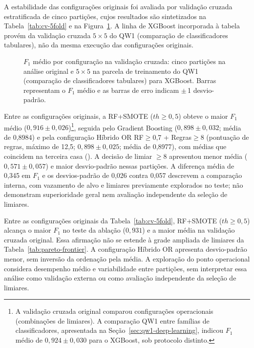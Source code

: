 \begin{sloppypar}
A estabilidade das configurações originais foi avaliada por validação cruzada estratificada de cinco partições, cujos resultados são sintetizados na Tabela~\ref{tab:cv-5fold} e na Figura~\ref{fig:cv-boxplots}. A linha de XGBoost incorporada à tabela provém da validação cruzada $5 \times 5$ do QW1 (comparação de classificadores tabulares), não da mesma execução das configurações originais.



\begin{figure}[!ht]
\centering
\resizebox{0.96\textwidth}{!}{}
\caption{$F_1$ médio por configuração na validação cruzada: cinco partições na análise original e $5 \times 5$ na parcela de treinamento do QW1 (comparação de classificadores tabulares) para XGBoost. Barras representam o $F_1$ médio e as barras de erro indicam $\pm$\,1 desvio-padrão.}
\label{fig:cv-boxplots}
\end{figure}

Entre as configurações originais, a RF+SMOTE ($th \geq 0{,}5$) obteve o maior $F_1$ médio ($0{,}916 \pm 0{,}026$)\footnote{A validação cruzada original comparou configurações operacionais (combinações de limiares). A comparação QW1 entre famílias de classificadores, apresentada na Seção~\ref{sec:qw1-deep-learning}, indicou $F_1$ médio de $0{,}924 \pm 0{,}030$ para o XGBoost, sob protocolo distinto.}, seguida pelo Gradient Boosting ($0{,}898 \pm 0{,}032$; média de 0,8984) e pela configuração Híbrido OR RF$\geq$0,7 + Regras$\geq$8 (pontuação de regras, máximo de 12,5; $0{,}898 \pm 0{,}025$; média de 0,8977), com médias que coincidem na terceira casa (). A decisão de limiar $\geq 8$ apresentou menor média ($0{,}571 \pm 0{,}057$) e maior desvio-padrão nessas partições. A diferença média de 0,345 em $F_1$ e os desvios-padrão de 0,026 contra 0,057 descrevem a comparação interna, com vazamento de alvo e limiares previamente explorados no teste; não demonstram superioridade geral nem avaliação independente da seleção de limiares.
\end{sloppypar}

Entre as configurações originais da Tabela~\ref{tab:cv-5fold}, RF+SMOTE ($th \geq 0{,}5$) alcança o maior $F_1$ no teste da ablação ($0{,}931$) e a maior média na validação cruzada original. Essa afirmação não se estende à grade ampliada de limiares da Tabela~\ref{tab:pareto-frontier}. A configuração Híbrido OR apresenta desvio-padrão menor, sem inversão da ordenação pela média. A exploração do ponto operacional considera desempenho médio e variabilidade entre partições, sem interpretar essa análise como validação externa ou como avaliação independente da seleção de limiares.

